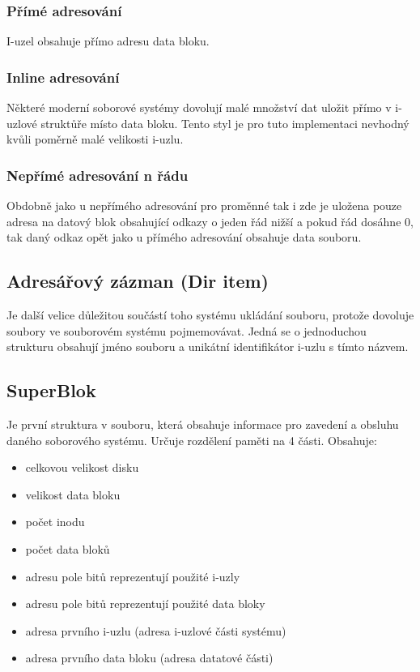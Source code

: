 \documentclass[12pt, a4paper]{report}
\begin{document}
\subsubsection{Přímé adresování}
I-uzel obsahuje přímo adresu data bloku.
\subsubsection{Inline adresování}
Některé moderní soborové systémy dovolují malé množství dat uložit přímo v i-uzlové struktůře místo data bloku. Tento styl je pro tuto implementaci nevhodný kvůli poměrně malé velikosti i-uzlu.
\subsubsection{Nepřímé adresování n řádu}
Obdobně jako u nepřímého adresování pro proměnné tak i zde je uložena pouze adresa na datový blok obsahující odkazy o jeden řád nižší a pokud řád dosáhne 0, tak daný odkaz opět jako u přímého adresování obsahuje data souboru.
\subsection{Adresářový zázman (Dir item)}
Je další velice důležitou součástí toho systému ukládání souboru, protože dovoluje soubory ve souborovém systému pojmemovávat. Jedná se o jednoduchou strukturu obsahují jméno souboru a unikátní identifikátor i-uzlu s tímto názvem.
\subsection{SuperBlok}
Je první struktura v souboru, která obsahuje informace pro zavedení a obsluhu daného soborového systému. Určuje rozdělení paměti na 4 části.
\linebreak
Obsahuje:
\begin{itemize}
 \item celkovou velikost disku
 \item velikost data bloku
 \item počet inodu
 \item počet data bloků
 \item adresu pole bitů reprezentují použité i-uzly
 \item adresu pole bitů reprezentují použité data bloky
 \item adresa prvního i-uzlu (adresa i-uzlové části systému)
 \item adresa prvního data bloku (adresa datatové části)
\end{itemize}
\end{document}
